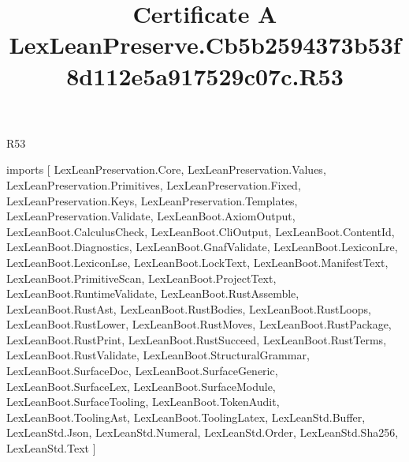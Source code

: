 \begin{lexlean}{R53}
\title{Certificate A LexLeanPreserve.Cb5b2594373b53f8d112e5a917529c07c.R53}
\begin{coremodule}
imports [
  LexLeanPreservation.Core,
  LexLeanPreservation.Values,
  LexLeanPreservation.Primitives,
  LexLeanPreservation.Fixed,
  LexLeanPreservation.Keys,
  LexLeanPreservation.Templates,
  LexLeanPreservation.Validate,
  LexLeanBoot.AxiomOutput,
  LexLeanBoot.CalculusCheck,
  LexLeanBoot.CliOutput,
  LexLeanBoot.ContentId,
  LexLeanBoot.Diagnostics,
  LexLeanBoot.GnafValidate,
  LexLeanBoot.LexiconLre,
  LexLeanBoot.LexiconLse,
  LexLeanBoot.LockText,
  LexLeanBoot.ManifestText,
  LexLeanBoot.PrimitiveScan,
  LexLeanBoot.ProjectText,
  LexLeanBoot.RuntimeValidate,
  LexLeanBoot.RustAssemble,
  LexLeanBoot.RustAst,
  LexLeanBoot.RustBodies,
  LexLeanBoot.RustLoops,
  LexLeanBoot.RustLower,
  LexLeanBoot.RustMoves,
  LexLeanBoot.RustPackage,
  LexLeanBoot.RustPrint,
  LexLeanBoot.RustSucceed,
  LexLeanBoot.RustTerms,
  LexLeanBoot.RustValidate,
  LexLeanBoot.StructuralGrammar,
  LexLeanBoot.SurfaceDoc,
  LexLeanBoot.SurfaceGeneric,
  LexLeanBoot.SurfaceLex,
  LexLeanBoot.SurfaceModule,
  LexLeanBoot.SurfaceTooling,
  LexLeanBoot.TokenAudit,
  LexLeanBoot.ToolingAst,
  LexLeanBoot.ToolingLatex,
  LexLeanStd.Buffer,
  LexLeanStd.Json,
  LexLeanStd.Numeral,
  LexLeanStd.Order,
  LexLeanStd.Sha256,
  LexLeanStd.Text
]


\end{coremodule}
\end{lexlean}

